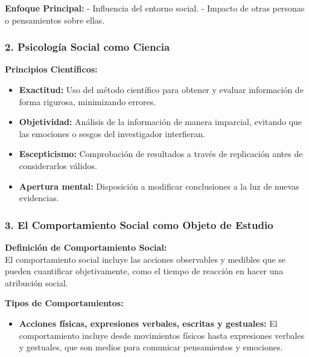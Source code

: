 \documentclass[
]{website}
\providecommand{\tightlist}{%
  \setlength{\itemsep}{0pt}\setlength{\parskip}{0pt}}
\begin{document}
\textbf{Enfoque Principal:}
- Influencia del entorno social.
- Impacto de otras personas o pensamientos sobre ellas.

\subsubsection*{2. Psicología Social como Ciencia}\label{psicologuxeda-social-como-ciencia}

\textbf{Principios Científicos:}

\begin{itemize}
\item
  \textbf{Exactitud:} Uso del método científico para obtener y evaluar información de forma rigurosa, minimizando errores.
\item
  \textbf{Objetividad:} Análisis de la información de manera imparcial, evitando que las emociones o sesgos del investigador interfieran.
\item
  \textbf{Escepticismo:} Comprobación de resultados a través de replicación antes de considerarlos válidos.
\item
  \textbf{Apertura mental:} Disposición a modificar conclusiones a la luz de nuevas evidencias.
\end{itemize}

\subsubsection*{3. El Comportamiento Social como Objeto de Estudio}\label{el-comportamiento-social-como-objeto-de-estudio}

\textbf{Definición de Comportamiento Social:}\\
El comportamiento social incluye las acciones observables y medibles que se pueden cuantificar objetivamente, como el tiempo de reacción en hacer una atribución social.

\textbf{Tipos de Comportamientos:}

\begin{itemize}
\tightlist
\item
  \textbf{Acciones físicas, expresiones verbales, escritas y gestuales:} El comportamiento incluye desde movimientos físicos hasta expresiones verbales y gestuales, que son medios para comunicar pensamientos y emociones.
\end{itemize}
\end{document}
